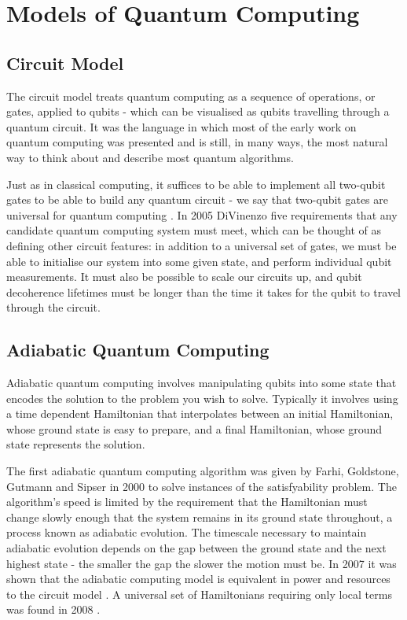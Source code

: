 \section{Models of Quantum Computing}

\subsection{Circuit Model}

The circuit model treats quantum computing as a sequence of operations, or gates, applied to qubits - which can be visualised as qubits travelling through a quantum circuit. It was the language in which most of the early work on quantum computing was presented and is still, in many ways, the most natural way to think about and describe most quantum algorithms.

Just as in classical computing, it suffices to be able to implement all two-qubit gates to be able to build any quantum circuit - we say that two-qubit gates are universal for quantum computing \cite{two_bit_gates_universal}. In 2005 DiVinenzo five requirements \cite{divincenzo_requirements} that any candidate quantum computing system must meet, which can be thought of as defining other circuit features: in addition to a universal set of gates, we must be able to initialise our system into some given state, and perform individual qubit measurements. It must also be possible to scale our circuits up, and qubit decoherence lifetimes must be longer than the time it takes for the qubit to travel through the circuit.

\subsection{Adiabatic Quantum Computing}

Adiabatic quantum computing involves manipulating qubits into some state that encodes the solution to the problem you wish to solve. Typically it involves using a time dependent Hamiltonian that interpolates between an initial Hamiltonian, whose ground state is easy to prepare, and a final Hamiltonian, whose ground state represents the solution. 

The first adiabatic quantum computing algorithm was given by Farhi, Goldstone, Gutmann and Sipser in 2000 \cite{adiabatic_qc} to solve instances of the satisfyability problem. The algorithm's speed is limited by the requirement that the Hamiltonian must change slowly enough that the system remains in its ground state throughout, a process known as adiabatic evolution. The timescale necessary to maintain adiabatic evolution depends on the gap between the ground state and the next highest state - the smaller the gap the slower the motion must be. In 2007 it was shown that the adiabatic computing model is equivalent in power and resources to the circuit model \cite{adiabatic_equivalence}. A universal set of Hamiltonians requiring only local terms was found in 2008 \cite{hamiltonians_for_adiabatic_qc}.


